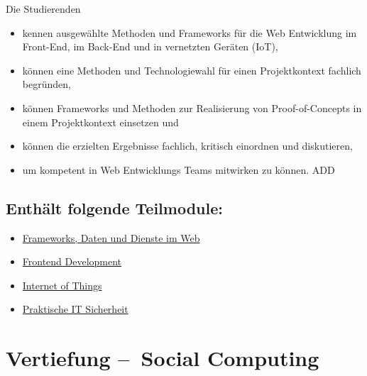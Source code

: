 Die Studierenden

\begin{itemize}
\tightlist
\item
  kennen ausgewählte Methoden und Frameworks für die Web Entwicklung im
  Front-End, im Back-End und in vernetzten Geräten (IoT),
\item
  können eine Methoden und Technologiewahl für einen Projektkontext
  fachlich begründen,
\item
  können Frameworks und Methoden zur Realisierung von Proof-of-Concepts
  in einem Projektkontext einsetzen und
\item
  können die erzielten Ergebnisse fachlich, kritisch einordnen und
  diskutieren,
\item
  um kompetent in Web Entwicklungs Teams mitwirken zu können. ADD
\end{itemize}

\hypertarget{enthuxe4lt-folgende-teilmodulepathlabelmi-2017modulbeschreibungen-bachelorba_vertiefung-web_development}{%
\section*{Enthält folgende
Teilmodule:\label{/mi-2017/modulbeschreibungen-bachelor/BA_Vertiefung-Web_Development}}\label{enthuxe4lt-folgende-teilmodulepathlabelmi-2017modulbeschreibungen-bachelorba_vertiefung-web_development}}

\begin{itemize}
\tightlist
\item
  \hyperref[/mi-2017/modulbeschreibungen-bachelor/BA_WD_Frameworks-daten-und-dienste]{Frameworks, Daten und Dienste im Web}
\item
  \hyperref[/mi-2017/modulbeschreibungen-bachelor/BA_WD_Frontend-Development]{Frontend Development}
\item
  \hyperref[/mi-2017/modulbeschreibungen-bachelor/BA_WD_Internet-of-things]{Internet of Things}
\item
  \hyperref[/mi-2017/modulbeschreibungen-bachelor/BA_WD_Praktische-IT-Sicherheit]{Praktische IT Sicherheit}
\end{itemize}

\hypertarget{vertiefung-social-computingpathlabelmi-2017modulbeschreibungen-bachelorba_vertiefung_socialcomputing}{%
\chapter{Vertiefung --~Social
Computing\label{/mi-2017/modulbeschreibungen-bachelor/BA_Vertiefung_SocialComputing}}\label{vertiefung-social-computingpathlabelmi-2017modulbeschreibungen-bachelorba_vertiefung_socialcomputing}}

